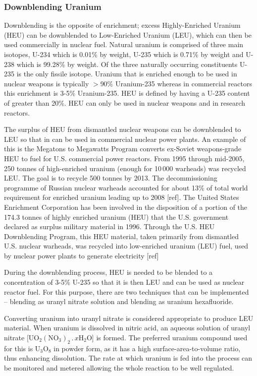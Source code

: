 \documentclass[twocolumn,a4paper]{article}
\begin{document}
\subsubsection{Downblending Uranium}
Downblending is the opposite of enrichment; excess Highly-Enriched
Uranium (HEU) can be downblended to Low-Enriched Uranium (LEU), which
can then be used commercially in nuclear fuel. Natural uranium is
comprised of three main isotopes, U-234 which is 0.01\% by weight,
U-235 which is 0.71\% by weight and U-238 which is 99.28\% by weight.
Of the three naturally occurring constituents U-235 is the only
fissile isotope.  Uranium that is enriched enough to be used in
nuclear weapons is typically \(>\)90\% Uranium-235 whereas in
commercial reactors this enrichment is 3-5\% Uranium-235.  HEU is
defined by having a U-235 content of greater than 20\%. HEU can only
be used in nuclear weapons and in research reactors.

The surplus of HEU from dismantled nuclear weapons can be downblended
to LEU so that in can be used in commercial nuclear power plants. An
example of this is the Megatons to Megawatts Program converts
ex-Soviet weapons-grade HEU to fuel for U.S. commercial power
reactors. From 1995 through mid-2005, 250 tonnes of high-enriched
uranium (enough for 10\,000 warheads) was recycled LEU. The goal is to
recycle 500 tonnes by 2013. The decommissioning programme of Russian
nuclear warheads accounted for about 13\% of total world requirement
for enriched uranium leading up to 2008 [ref]. The United States
Enrichment Corporation has been involved in the disposition of a
portion of the 174.3 tonnes of highly enriched uranium (HEU) that the
U.S. government declared as surplus military material in 1996. Through
the U.S. HEU Downblending Program, this HEU material, taken primarily
from dismantled U.S. nuclear warheads, was recycled into low-enriched
uranium (LEU) fuel, used by nuclear power plants to generate
electricity [ref]

During the downblending process, HEU is needed to be blended to a
concentration of 3-5\% U-235 so that it is then LEU and can be used as
nuclear reactor fuel. For this purpose, there are two techniques that
can be implemented -- blending as uranyl nitrate solution and blending
as uranium hexafluoride.

Converting uranium into uranyl nitrate is considered appropriate to
produce LEU material.  When uranium is dissolved in nitric acid, an
aqueous solution of uranyl nitrate
[\(\mathrm{UO_2(NO_3)_2\,.\,}x\mathrm{H_2O}\)] is formed. The
preferred uranium compound used for this is \(\mathrm{U_3O_8}\) in
powder form, as it has a high surface-area-to-volume ratio, thus
enhancing dissolution. The rate at which uranium is fed into the
process can be monitored and metered allowing the whole reaction to be
well regulated.
\end{document}
